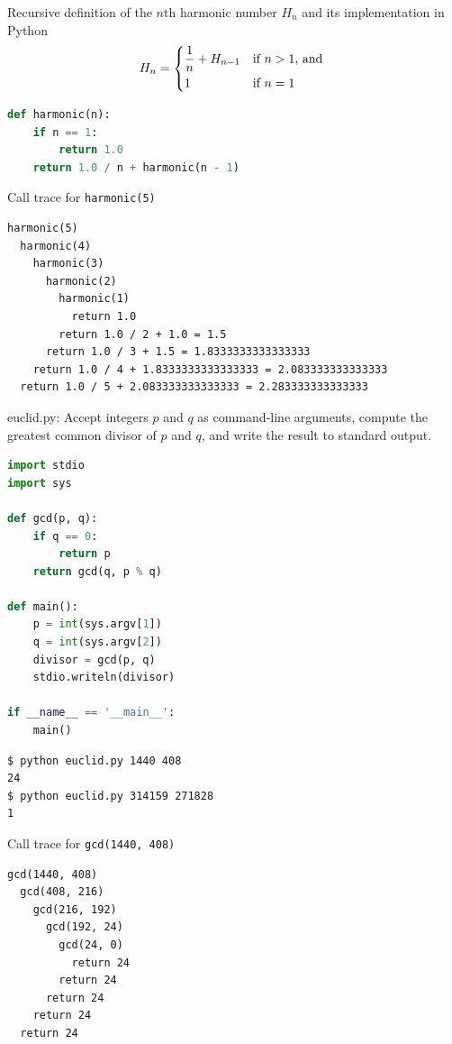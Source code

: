 \documentclass[8pt,a4paper,compress]{beamer}
\begin{document}
\begin{frame}[fragile]
Recursive definition of the $n$th harmonic number $H_n$ and its implementation in Python
\[
H_n = \begin{dcases*}
\frac{1}{n} + H_{n-1} & if $n > 1$, and \\
1       & if $n=1$
\end{dcases*}
\]

\begin{lstlisting}[language=Python]
def harmonic(n):
    if n == 1:
        return 1.0
    return 1.0 / n + harmonic(n - 1)
\end{lstlisting}

\bigskip

Call trace for \lstinline{harmonic(5)}
\begin{lstlisting}[language={}]
harmonic(5)
  harmonic(4)
    harmonic(3)
      harmonic(2)
        harmonic(1)
          return 1.0
        return 1.0 / 2 + 1.0 = 1.5
      return 1.0 / 3 + 1.5 = 1.8333333333333333
    return 1.0 / 4 + 1.8333333333333333 = 2.083333333333333
  return 1.0 / 5 + 2.083333333333333 = 2.283333333333333
\end{lstlisting}
\end{frame}

\begin{frame}[fragile]
\begin{framed}
\tiny euclid.py: Accept integers $p$ and $q$ as command-line arguments, compute the greatest common divisor of $p$ and $q$, and write the result to standard output.
\end{framed}

\begin{lstlisting}[language=Python]
import stdio
import sys

def gcd(p, q):
    if q == 0:
        return p
    return gcd(q, p % q)

def main():
    p = int(sys.argv[1])
    q = int(sys.argv[2])
    divisor = gcd(p, q)
    stdio.writeln(divisor)

if __name__ == '__main__':
    main()
\end{lstlisting}

\begin{lstlisting}[language={}]
$ python euclid.py 1440 408
24
$ python euclid.py 314159 271828
1
\end{lstlisting}
\end{frame}

\begin{frame}[fragile]
Call trace for \lstinline{gcd(1440, 408)}

\begin{lstlisting}[language={}]
gcd(1440, 408)
  gcd(408, 216)
    gcd(216, 192)
      gcd(192, 24)
        gcd(24, 0)
          return 24
        return 24
      return 24
    return 24
  return 24
\end{lstlisting}
\end{frame}
\end{document}
